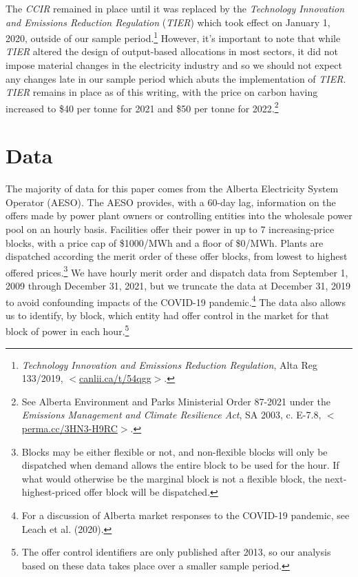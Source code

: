 \documentclass[12pt]{article}
\begin{document}
The \emph{CCIR} remained in place until it was replaced by the \emph{Technology Innovation and Emissions Reduction Regulation} (\emph{TIER}) which took effect on January 1, 2020, outside of our sample period.\footnote{\textit{Technology Innovation and Emissions Reduction Regulation}, Alta Reg 133/2019, $<$\url{canlii.ca/t/54qgg}$>$.}  However, it's important to note that while \emph{TIER} altered the design of output-based allocations in most sectors, it did not impose material changes in the electricity industry and so we should not expect any changes late in our sample period which abuts the implementation of \emph{TIER}. \emph{TIER} remains in place as of this writing, with the price on carbon having increased to \$40 per tonne for 2021 and \$50 per tonne for 2022.\footnote{See Alberta Environment and Parks Ministerial Order 87-2021 under the \emph{Emissions Management and Climate Resilience Act}, SA 2003, c. E-7.8, $<$\url{perma.cc/3HN3-H9RC}$>$.}

\section{Data}\label{sec:data}

The majority of data for this paper comes from the Alberta Electricity System Operator (AESO). The AESO provides, with a 60-day lag, information on the offers made by power plant owners or controlling entities into the wholesale power pool on an hourly basis. Facilities offer their power in up to 7 increasing-price blocks, with a price cap of \$1000/MWh and a floor of \$0/MWh. Plants are dispatched according the merit order of these offer blocks, from lowest to highest offered prices.\footnote{Blocks may be either flexible or not, and non-flexible blocks will only be dispatched when demand allows the entire block to be used for the hour. If what would otherwise be the marginal block is not a flexible block, the next-highest-priced offer block will be dispatched.} We have hourly merit order and dispatch data from September 1, 2009 through December 31, 2021, but we truncate the data at December 31, 2019 to avoid confounding impacts of the COVID-19 pandemic.\footnote{For a discussion of Alberta market responses to the COVID-19 pandemic, see Leach et al. (2020).} The data also allows us to identify, by block, which entity had offer control in the market for that block of power in each hour.\footnote{The offer control identifiers are only published after 2013, so our analysis based on these data takes place over a smaller sample period.}
\end{document}
